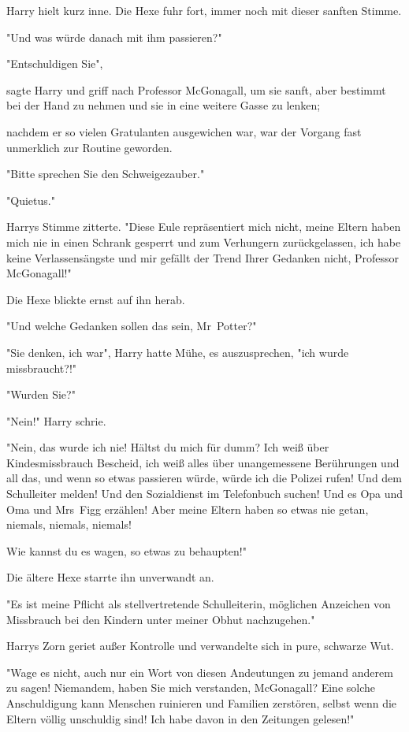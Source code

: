 {Harry hielt kurz inne. Die Hexe fuhr fort, immer noch mit dieser sanften Stimme.

"Und was würde danach mit ihm passieren?"

"Entschuldigen Sie",

sagte Harry und griff nach Professor McGonagall, um sie sanft, aber bestimmt bei der Hand zu nehmen und sie in eine weitere Gasse zu lenken;

nachdem er so vielen Gratulanten ausgewichen war, war der Vorgang fast unmerklich zur Routine geworden.

"Bitte sprechen Sie den Schweigezauber."

"Quietus."

Harrys Stimme zitterte. "Diese Eule repräsentiert mich nicht, meine Eltern haben mich nie in einen Schrank gesperrt und zum Verhungern zurückgelassen, ich habe keine Verlassensängste und mir gefällt der Trend Ihrer Gedanken nicht, Professor McGonagall!"

Die Hexe blickte ernst auf ihn herab.

"Und welche Gedanken sollen das sein, Mr~Potter?"

"Sie denken, ich war", Harry hatte Mühe, es auszusprechen, "ich wurde missbraucht?!"

"Wurden Sie?"

"Nein!" Harry schrie.

"Nein, das wurde ich nie! Hältst du mich für dumm? Ich weiß über Kindesmissbrauch Bescheid, ich weiß alles über unangemessene Berührungen und all das, und wenn so etwas passieren würde, würde ich die Polizei rufen! Und dem Schulleiter melden! Und den Sozialdienst im Telefonbuch suchen! Und es Opa und Oma und Mrs~Figg erzählen! Aber meine Eltern haben so etwas nie getan, niemals, niemals, niemals!

Wie kannst du es wagen, so etwas zu behaupten!"

Die ältere Hexe starrte ihn unverwandt an.

"Es ist meine Pflicht als stellvertretende Schulleiterin, möglichen Anzeichen von Missbrauch bei den Kindern unter meiner Obhut nachzugehen."

Harrys Zorn geriet außer Kontrolle und verwandelte sich in pure, schwarze Wut.

"Wage es nicht, auch nur ein Wort von diesen Andeutungen zu jemand anderem zu sagen! Niemandem, haben Sie mich verstanden, McGonagall? Eine solche Anschuldigung kann Menschen ruinieren und Familien zerstören, selbst wenn die Eltern völlig unschuldig sind! Ich habe davon in den Zeitungen gelesen!"

}
